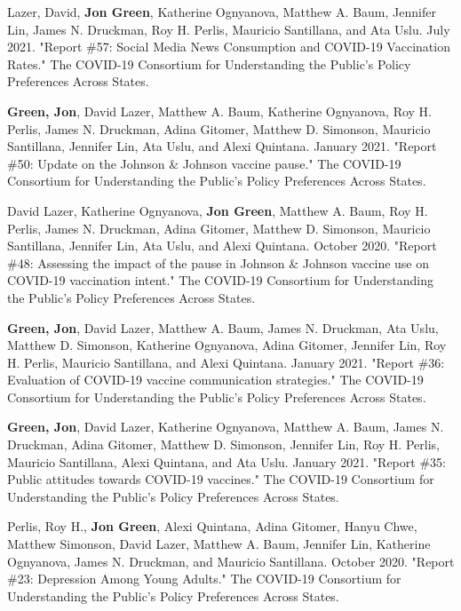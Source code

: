 \documentclass[letterpaper]{article}
\renewenvironment{itemize}{
  \begin{list}{}{
    \setlength{\leftmargin}{1.5em}
  }
}{
  \end{list}
}
\begin{document}
\begin{itemize}

\item  Lazer, David, \textbf{Jon Green},  Katherine Ognyanova, Matthew A. Baum, Jennifer Lin, James N. Druckman, Roy H. Perlis, Mauricio Santillana, and Ata Uslu. July 2021. "Report \#57: Social Media News Consumption and COVID-19 Vaccination Rates." The COVID-19 Consortium for Understanding the Public’s Policy Preferences Across States.

\item  \textbf{Green, Jon}, David Lazer, Matthew A. Baum, Katherine Ognyanova, Roy H. Perlis, James N. Druckman, Adina Gitomer, Matthew D. Simonson, Mauricio Santillana, Jennifer Lin, Ata Uslu, and Alexi Quintana. January 2021. "Report \#50: Update on the Johnson \& Johnson vaccine pause." The COVID-19 Consortium for Understanding the Public’s Policy Preferences Across States.

\item David Lazer, Katherine Ognyanova, \textbf{Jon Green}, Matthew A. Baum, Roy H. Perlis, James N. Druckman, Adina Gitomer, Matthew D. Simonson, Mauricio Santillana, Jennifer Lin, Ata Uslu, and Alexi Quintana. October 2020. "Report \#48: Assessing the impact of the pause in Johnson \& Johnson vaccine use on COVID-19 vaccination intent." The COVID-19 Consortium for Understanding the Public’s Policy Preferences Across States.

\item  \textbf{Green, Jon}, David Lazer, Matthew A. Baum, James N. Druckman, Ata Uslu, Matthew D. Simonson, Katherine Ognyanova, Adina Gitomer, Jennifer Lin, Roy H. Perlis, Mauricio Santillana, and Alexi Quintana. January 2021. "Report \#36: Evaluation of COVID-19 vaccine communication strategies." The COVID-19 Consortium for Understanding the Public’s Policy Preferences Across States.

\item  \textbf{Green, Jon}, David Lazer, Katherine Ognyanova, Matthew A. Baum, James N. Druckman, Adina Gitomer, Matthew D. Simonson, Jennifer Lin, Roy H. Perlis, Mauricio Santillana, Alexi Quintana, and Ata Uslu. January 2021. "Report \#35: Public attitudes towards COVID-19 vaccines." The COVID-19 Consortium for Understanding the Public’s Policy Preferences Across States.

\item Perlis, Roy H., \textbf{Jon Green}, Alexi Quintana, Adina Gitomer, Hanyu Chwe, Matthew Simonson, David Lazer, Matthew A. Baum, Jennifer Lin, Katherine Ognyanova, James N. Druckman, and Mauricio Santillana. October 2020. "Report \#23: Depression Among Young Adults." The COVID-19 Consortium for Understanding the Public’s Policy Preferences Across States.


\end{itemize}
\end{document}
